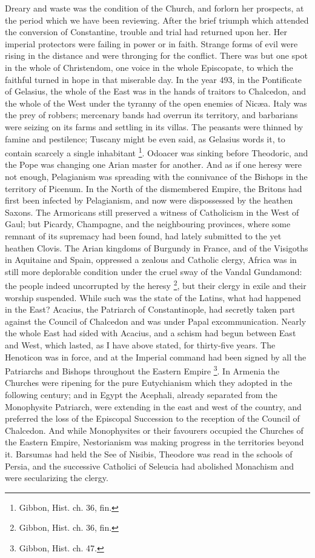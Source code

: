 Dreary and waste was the condition of the Church, and forlorn her
prospects, at the period which we have been reviewing. After the brief
triumph which attended the conversion of Constantine, trouble and
trial had returned upon her. Her imperial protectors were failing in
power or in faith. Strange forms of evil were rising in the distance
and were thronging for the conflict. There was but one spot in the
whole of Christendom, one voice in the whole Episcopate, to which the
faithful turned in hope in that miserable day. In the year 493, in the
Pontificate of Gelasius, the whole of the East was in the hands of
traitors to Chalcedon, and the whole of the West under the tyranny of
the open enemies of Nicæa. Italy was the prey of robbers; mercenary
bands had overrun its territory, and barbarians were seizing on its
farms and settling in its villas. The peasants were thinned by famine
and pestilence; Tuscany might be even said, as Gelasius words it, to
contain scarcely a single inhabitant \footnote{Gibbon, Hist. ch. 36, fin.}. Odoacer was sinking before Theodoric, and the Pope was
changing one Arian master for another. And as if one heresy were not
enough, Pelagianism was spreading with the connivance of the Bishops
in the territory of Picenum. In the North of the dismembered Empire,
the Britons had first been infected by Pelagianism, and now were
dispossessed by the heathen Saxons. The Armoricans still preserved a
witness of Catholicism in the West of Gaul; but Picardy, Champagne,
and the neighbouring provinces, where some remnant of its supremacy
had been found, had lately submitted to the yet heathen Clovis. The
Arian kingdoms of Burgundy in France, and of the Visigoths in
Aquitaine and Spain, oppressed a zealous and Catholic clergy, Africa
was in still more deplorable condition under the cruel sway of the
Vandal Gundamond: the people indeed uncorrupted by the heresy \footnote{Gibbon, Hist. ch. 36, fin.}, but their clergy in exile and their worship suspended. While
such was the state of the Latins, what had happened in the East?
Acacius, the Patriarch of Constantinople, had secretly taken part
against the Council of Chalcedon and was under Papal excommunication.
Nearly the whole East had sided with Acacius, and a schism had begun
between East and West, which lasted, as I have above stated, for
thirty-five years. The Henoticon was in force, and at the Imperial
command had been signed by all the Patriarchs and Bishops throughout
the Eastern Empire \footnote{Gibbon, Hist. ch. 47.}.
In Armenia the Churches were ripening for the pure Eutychianism which
they adopted in the following century; and in Egypt the Acephali,
already separated from the Monophysite Patriarch, were extending in
the east and west of the country, and preferred the loss of the
Episcopal Succession to the reception of the Council of Chalcedon. And
while Monophysites or their favourers occupied the Churches of the
Eastern Empire, Nestorianism was making progress in the territories
beyond it. Barsumas had held the See of Nisibis, Theodore was read in
the schools of Persia, and the successive Catholici of Seleucia had
abolished Monachism and were secularizing the clergy.

